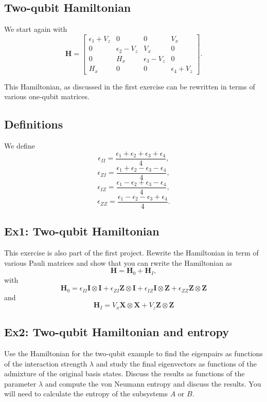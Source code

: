 \documentclass[%
oneside,                 %
final,                   %
10pt]{article}
\begin{document}
\subsection{Two-qubit Hamiltonian}

We start again with 
\[
\bm{H}=\begin{bmatrix} \epsilon_{1}+V_z & 0 & 0 & V_x \\
                       0  & \epsilon_{2}-V_z & V_x & 0 \\
		       0 & H_x & \epsilon_{3}-V_z & 0 \\
		       H_x & 0 & 0 & \epsilon_{4} +V_z \end{bmatrix}.
\] 

This Hamiltonian, as discussed in the first exercise can be rewritten in terms of various one-qubit matrices.

\subsection{Definitions}

We define
\[
\epsilon_{II}=\frac{\epsilon_{1}+\epsilon_{2}+\epsilon_{3}+\epsilon_{4}}{4},
\]
\[
\epsilon_{ZI}=\frac{\epsilon_{1}+\epsilon_{2}-\epsilon_{3}-\epsilon_{4}}{4},
\]
\[
\epsilon_{IZ}=\frac{\epsilon_{1}-\epsilon_{2}+\epsilon_{3}-\epsilon_{4}}{4},
\]
\[
\epsilon_{ZZ}=\frac{\epsilon_{1}-\epsilon_{2}-\epsilon_{3}+\epsilon_{4}}{4}.
\]

\subsection{Ex1: Two-qubit Hamiltonian}

This exercise is also part of the first project.
Rewrite the Hamiltonian in term of various Pauli matrices and show that you can rwrite the Hamiltonian as
\[
\bm{H}=\bm{H}_0+\bm{H}_I,
\]
with 
\[
\bm{H}_0=\epsilon_{II}\bm{I}\otimes\bm{I}+\epsilon_{ZI}\bm{Z}\otimes\bm{I}+\epsilon_{IZ}\bm{I}\otimes\bm{Z}+\epsilon_{ZZ}\bm{Z}\otimes\bm{Z}
\]
and 
\[
\bm{H}_I=V_x\bm{X}\otimes\bm{X}+V_z\bm{Z}\otimes\bm{Z}
\]

\subsection{Ex2: Two-qubit Hamiltonian and entropy}

Use the Hamiltonian for the two-qubit example to find the eigenpairs
as functions of the interaction strength $\lambda$ and study the final
eigenvectors as functions of the admixture of the original basis
states.  Discuss the results as functions of the parameter $\lambda$ and compute the von Neumann
entropy and discuss the results. You will need to calculate the entropy of the subsystems $A$ or $B$.


\end{document}
